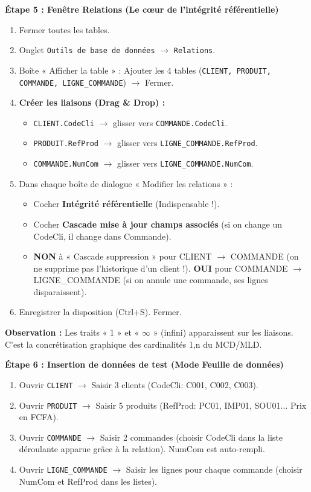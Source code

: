 \documentclass[11pt]{article}
\begin{document}
\begin{experience}
\textbf{Étape 5 : Fenêtre Relations (Le cœur de l'intégrité référentielle)}
\begin{enumerate}
    \item Fermer toutes les tables.
    \item Onglet \texttt{Outils de base de données} $\rightarrow$ \texttt{Relations}.
    \item Boîte « Afficher la table » : Ajouter les 4 tables (\texttt{CLIENT, PRODUIT, COMMANDE, LIGNE\_COMMANDE}) $\rightarrow$ Fermer.
    \item \textbf{Créer les liaisons (Drag \& Drop) :}
    \begin{itemize}
        \item \texttt{CLIENT.CodeCli} $\rightarrow$ glisser vers \texttt{COMMANDE.CodeCli}.
        \item \texttt{PRODUIT.RefProd} $\rightarrow$ glisser vers \texttt{LIGNE\_COMMANDE.RefProd}.
        \item \texttt{COMMANDE.NumCom} $\rightarrow$ glisser vers \texttt{LIGNE\_COMMANDE.NumCom}.
    \end{itemize}
    \item Dans chaque boîte de dialogue « Modifier les relations » :
    \begin{itemize}
        \item Cocher \textbf{Intégrité référentielle} (Indispensable !).
        \item Cocher \textbf{Cascade mise à jour champs associés} (si on change un CodeCli, il change dans Commande).
        \item \textbf{NON} à « Cascade suppression » pour CLIENT $\rightarrow$ COMMANDE (on ne supprime pas l'historique d'un client !). \textbf{OUI} pour COMMANDE $\rightarrow$ LIGNE\_COMMANDE (si on annule une commande, ses lignes disparaissent).
    \end{itemize}
    \item Enregistrer la disposition (Ctrl+S). Fermer.
\end{enumerate}

\textbf{Observation :} Les traits « 1 » et « $\infty$ » (infini) apparaissent sur les liaisons. C'est la concrétisation graphique des cardinalités 1,n du MCD/MLD.

\textbf{Étape 6 : Insertion de données de test (Mode Feuille de données)}
\begin{enumerate}
    \item Ouvrir \texttt{CLIENT} $\rightarrow$ Saisir 3 clients (CodeCli: C001, C002, C003).
    \item Ouvrir \texttt{PRODUIT} $\rightarrow$ Saisir 5 produits (RefProd: PC01, IMP01, SOU01... Prix en FCFA).
    \item Ouvrir \texttt{COMMANDE} $\rightarrow$ Saisir 2 commandes (choisir CodeCli dans la liste déroulante apparue grâce à la relation). NumCom est auto-rempli.
    \item Ouvrir \texttt{LIGNE\_COMMANDE} $\rightarrow$ Saisir les lignes pour chaque commande (choisir NumCom et RefProd dans les listes).
\end{enumerate}


\end{experience}
\end{document}
